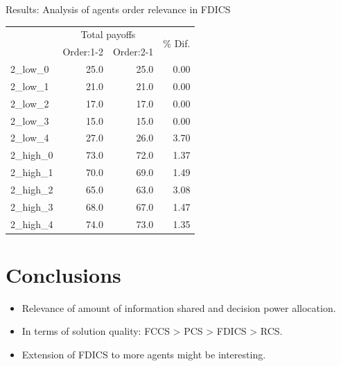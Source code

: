 \documentclass[aspectratio=169]{beamer}
\begin{document}
\begin{frame}{Results: Analysis of agents order relevance in FDICS}

\begin{table}[ht!]
\centering
\begin{adjustbox}{max width=\textwidth}
\begin{tabular}{lrrr}
\toprule
{} & \multicolumn{2}{c}{Total payoffs} & \multirow{2}{*}{\% Dif.}  \\
{} &  Order:1-2 &  Order:2-1 &       \\
\midrule
2\_low\_0  &           25.0 &           25.0 &  0.00 \\
2\_low\_1  &           21.0 &           21.0 &  0.00  \\
2\_low\_2  &           17.0 &           17.0 &  0.00\\
2\_low\_3  &           15.0 &           15.0 &  0.00  \\
2\_low\_4  &           27.0 &           26.0 &  3.70\\
2\_high\_0 &           73.0 &           72.0 &  1.37 \\
2\_high\_1 &           70.0 &           69.0 &  1.49\\
2\_high\_2 &           65.0 &           63.0 &  3.08 \\
2\_high\_3 &           68.0 &           67.0 &  1.47  \\
2\_high\_4 &           74.0 &           73.0 &  1.35 \\
\bottomrule
\end{tabular}
\end{adjustbox}
\end{table}
\end{frame}


\section{Conclusions}

\begin{frame}{\secname}
\begin{itemize}
\setlength\itemsep{1em}
\item<1-> Relevance of amount of information shared and decision power allocation.
\item<2-> In terms of solution quality: FCCS > PCS > \alert{FDICS > RCS}.
\item<3-> Extension of FDICS to more agents might be interesting.
\end{itemize}
\end{frame}
\end{document}
